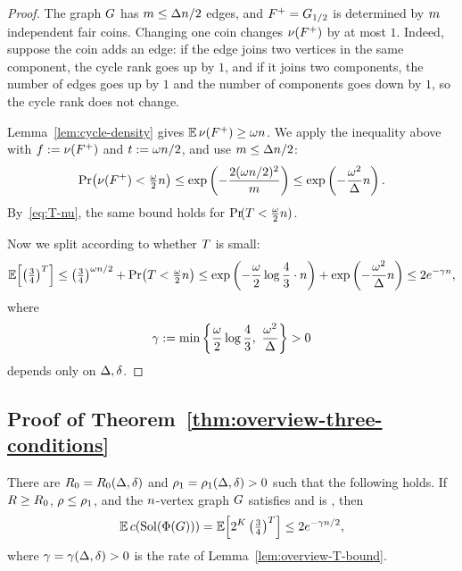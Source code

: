 \begin{proof}
The graph \(G\) has \(m\le\Delta n/2\) edges, and
\({F^{+}}=G_{1/2}\) is determined by \(m\) independent fair coins.
Changing one coin changes \(\nu({F^{+}})\) by at most \(1\). Indeed, suppose
the coin adds an edge: if the edge joins two vertices in the same component,
the cycle rank goes up by \(1\), and if it joins two components, the number of
edges goes up by \(1\) and the number of components goes down by \(1\), so the
cycle rank does not change.

Lemma~\ref{lem:cycle-density} gives \(\mathbb{E}\,\nu({F^{+}})\ge\omega n\). We apply
the inequality above with \(f:=\nu({F^{+}})\) and \(t:=\omega n/2\), and use
\(m\le\Delta n/2\):
\[
  \Prx{\cyc{\Akept}<\tfrac{\cycd}{2}\nvert}
  \le\exp\left(-\frac{2(\cycd\nvert/2)^2}{\medge}\right)
  \le\exp\left(-\frac{\cycd^{2}}{\degb}\nvert\right) .
\]
By~\eqref{eq:T-nu}, the same bound holds for
\(\Prx{\Tdef<\tfrac{\cycd}{2}\nvert}\).

Now we split according to whether \(T\) is small:
\[
  \Ex{\left(\tfrac34\right)^{\Tdef}}
  \le \left(\tfrac34\right)^{\cycd\nvert/2}+\Prx{\Tdef<\tfrac{\cycd}{2}\nvert}
  \le \exp\left(-\frac{\cycd}{2}\log\frac43\cdot\nvert\right)
     +\exp\left(-\frac{\cycd^{2}}{\degb}\nvert\right)
  \le 2e^{-\rate\nvert},
\]
where
\[
  \rate:=\min\left\{\frac{\cycd}{2}\log\frac43,\ \frac{\cycd^{2}}{\degb}\right\}>0
\]
depends only on \(\Delta,\delta\).
\end{proof}

\subsection{Proof of Theorem~\texorpdfstring{\ref{thm:overview-three-conditions}}{1.12}}

\begin{threeconditionsrestatement}
There are \(R_0=R_0(\Delta,\delta)\) and \(\rho_1=\rho_1(\Delta,\delta)>0\)
such that the following holds. If \(R\ge R_0\), \(\rho\le\rho_1\), and
the \(n\)-vertex graph \(G\) satisfies \Hyp{} and is
\loctree{\rad}{\nontree}, then
\[
  \E\,\solcomp{\rform{\Gin}}
  =\Ex{2^{\Kdef}\left(\tfrac34\right)^{\Tdef}}
  \le 2e^{-\rate\nvert/2},
\]
where \(\gamma=\gamma(\Delta,\delta)>0\) is the rate of
Lemma~\ref{lem:overview-T-bound}.
\end{threeconditionsrestatement}

